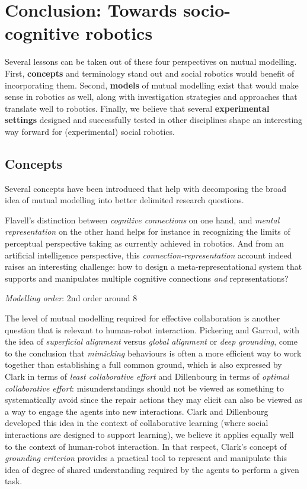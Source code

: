 \documentclass{sig-alternate}
\begin{document}
\section{Conclusion: Towards socio-cognitive robotics}

Several lessons can be taken out of these four perspectives on mutual modelling.
First, \textbf{concepts} and terminology stand out and social robotics would
benefit of incorporating them. Second, \textbf{models} of mutual modelling exist
that would make sense in robotics as well, along with investigation strategies
and approaches that translate well to robotics. Finally, we believe that several
\textbf{experimental settings} designed and successfully tested in other
disciplines shape an interesting way forward for (experimental) social robotics.

\subsection{Concepts}

Several concepts have been introduced that help with decomposing the broad idea
of mutual modelling into better delimited research questions.

Flavell's distinction between \emph{cognitive connections} on one hand, and
\emph{mental representation} on the other hand helps for instance in recognizing
the limits of perceptual perspective taking as currently achieved in robotics.
And from an artificial intelligence perspective, this
\emph{connection-representation} account indeed raises an interesting challenge:
how to design a meta-representational system that supports and manipulates
multiple cognitive connections \emph{and} representations?

\emph{Modelling order}: 2nd order around 8~\cite{perner1988higher}

The level of mutual modelling required for effective collaboration is another
question that is relevant to human-robot interaction. Pickering and Garrod, with
the idea of \emph{superficial alignment} versus \emph{global alignment} or
\emph{deep grounding}, come to the conclusion that \emph{mimicking} behaviours
is often a more efficient way to work together than establishing a full common
ground, which is also expressed by Clark in terms of \emph{least collaborative
effort} and Dillenbourg in terms of \emph{optimal collaborative effort}:
misunderstandings should not be viewed as something to systematically avoid
since the repair actions they may elicit can also be viewed as a way to engage
the agents into new interactions. Clark and Dillenbourg developed this idea in
the context of collaborative learning (where social interactions are designed to
support learning), we believe it applies equally well to the context of
human-robot interaction.  In that respect, Clark's concept of \emph{grounding
criterion} provides a practical tool to represent and manipulate this idea of
degree of shared understanding required by the agents to perform a given task.
\end{document}
